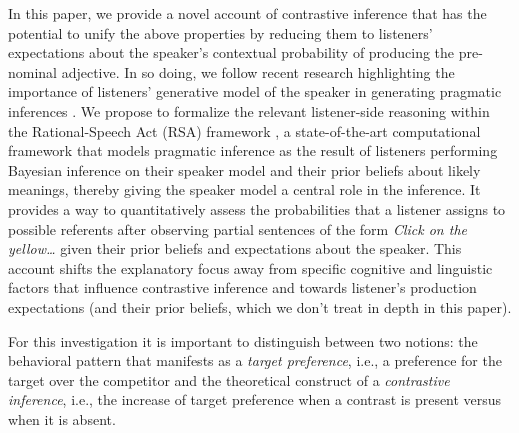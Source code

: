 \documentclass[10pt,letterpaper]{article}
\begin{document}
In this paper, we provide a novel account of contrastive inference that has the potential to unify the above properties by reducing them to listeners' expectations about the speaker's contextual probability of producing the pre-nominal adjective. In so doing, we follow recent research highlighting the importance of listeners' generative model of the speaker in generating pragmatic inferences \cite{Hawkins:2018,Kao:2015,Kleinschmidt:2011,Macdonald:1994,Mitchell:1995,Rubio-Fernandez:2018}. We propose to formalize the relevant listener-side reasoning within the Rational-Speech Act (RSA) framework \cite{Frank:2012, Goodman:2016}, a state-of-the-art computational framework that models pragmatic inference as the result of listeners performing Bayesian inference on their speaker model and their prior beliefs about likely meanings, thereby giving the speaker model a central role in the inference. It provides a way to quantitatively assess the probabilities that a listener assigns to possible referents after observing partial sentences of the form \emph{Click on the yellow\dots} given their prior beliefs and expectations about the speaker. This account shifts the explanatory focus away from specific cognitive and linguistic factors that influence contrastive inference and towards listener's production expectations (and their prior beliefs, which we don't treat in depth in this paper).


For this investigation it is important to distinguish between two notions: the behavioral pattern that manifests as a \emph{target preference}, i.e., a preference for the target over the competitor and the theoretical construct of a \emph{contrastive inference}, i.e., the increase of target preference when a contrast is present versus when it is absent.
\end{document}
